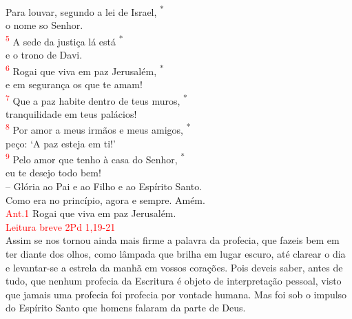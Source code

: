 \documentclass{book}
\begin{document}
\begin{center}
    \textsuperscript{\underline{\hspace{.07in}}\textcolor{red}{}} Para louvar, segundo a lei de Israel, \textsuperscript{*} \\
    o nome so Senhor. \\
    \textsuperscript{\underline{\hspace{.07in}}\textcolor{red}{5}} A sede da justiça lá está \textsuperscript{*} \\
    e o trono de Davi.
    \vspace{.2cm} \\
    \textsuperscript{\underline{\hspace{.07in}}\textcolor{red}{6}} Rogai que viva em paz Jerusalém, \textsuperscript{*} \\
    e em segurança os que te amam! \\
    \textsuperscript{\underline{\hspace{.07in}}\textcolor{red}{7}} Que a paz habite dentro de teus muros, \textsuperscript{*} \\
    tranquilidade em teus palácios!
    \vspace{.2cm} \\
    \textsuperscript{\underline{\hspace{.07in}}\textcolor{red}{8}} Por amor a meus irmãos e meus amigos, \textsuperscript{*} \\
    peço: `A paz esteja em ti!' \\
    \textsuperscript{\underline{\hspace{.07in}}\textcolor{red}{9}} Pelo amor que tenho à casa do Senhor, \textsuperscript{*} \\
    eu te desejo todo bem!
    \vspace{.2cm} \\
    -- Glória ao Pai e ao Filho e ao Espírito Santo. \\
    Como era no princípio, agora e sempre. Amém.
    \vspace{.2cm} \\
    \textcolor{red}{Ant.1} Rogai que viva em paz Jerusalém.
    \vspace{.2cm} \\
    \textcolor{red}{Leitura breve 2Pd 1,19-21}
    \vspace{.2cm} \\
    Assim se nos tornou ainda mais firme a palavra da profecia, que fazeis bem em ter diante dos olhos, como lâmpada que brilha em lugar escuro, até clarear o dia e levantar-se a estrela da manhã em vossos corações. Pois deveis saber, antes de tudo, que nenhum profecia da Escritura é objeto de interpretação pessoal, visto que jamais uma profecia foi profecia por vontade humana. Mas foi sob o impulso do Espírito Santo que homens falaram da parte de Deus.

\end{center}
\end{document}
